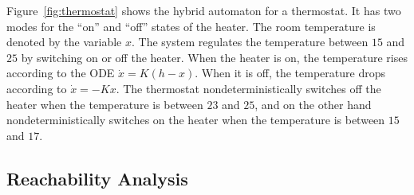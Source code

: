 \begin{example}
 Figure~\ref{fig:thermostat} shows the hybrid automaton for a thermostat. It has two modes for the ``on'' and ``off'' states of the heater. The room temperature is denoted by the variable $x$. The system regulates the temperature between $15$ and $25$ by switching on or off the heater. When the heater is on, the temperature rises according to the ODE $\dot{x} = K(h-x)$. When it is off, the temperature drops according to $\dot{x} = -Kx$. The thermostat nondeterministically switches off the heater when the temperature is between $23$ and $25$, and on the other hand nondeterministically switches on the heater when the temperature is between $15$ and $17$.
\end{example}

\begin{minipage}{0.48\textwidth}
 \centering
 \label{fig:thermostat}
\end{minipage}
\hspace{1ex}
\begin{minipage}{0.48\textwidth}
\end{minipage}

\subsection{Reachability Analysis}







